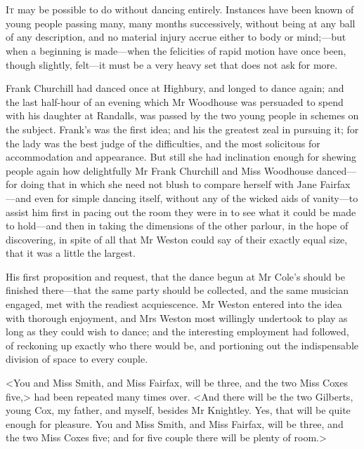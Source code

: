 \chapter[Chapter \thechapter]{}
\lettrine[lraise=0.3]{I}{t} may be possible to do without dancing entirely. Instances have been known of young people passing many, many months successively, without being at any ball of any description, and no material injury accrue either to body or mind;—but when a beginning is made—when the felicities of rapid motion have once been, though slightly, felt—it must be a very heavy set that does not ask for more.

Frank Churchill had danced once at Highbury, and longed to dance again; and the last half-hour of an evening which Mr Woodhouse was persuaded to spend with his daughter at Randalls, was passed by the two young people in schemes on the subject. Frank's was the first idea; and his the greatest zeal in pursuing it; for the lady was the best judge of the difficulties, and the most solicitous for accommodation and appearance. But still she had inclination enough for shewing people again how delightfully Mr Frank Churchill and Miss Woodhouse danced—for doing that in which she need not blush to compare herself with Jane Fairfax—and even for simple dancing itself, without any of the wicked aids of vanity—to assist him first in pacing out the room they were in to see what it could be made to hold—and then in taking the dimensions of the other parlour, in the hope of discovering, in spite of all that Mr Weston could say of their exactly equal size, that it was a little the largest.

His first proposition and request, that the dance begun at Mr Cole's should be finished there—that the same party should be collected, and the same musician engaged, met with the readiest acquiescence. Mr Weston entered into the idea with thorough enjoyment, and Mrs Weston most willingly undertook to play as long as they could wish to dance; and the interesting employment had followed, of reckoning up exactly who there would be, and portioning out the indispensable division of space to every couple.

<You and Miss Smith, and Miss Fairfax, will be three, and the two Miss Coxes five,> had been repeated many times over. <And there will be the two Gilberts, young Cox, my father, and myself, besides Mr Knightley. Yes, that will be quite enough for pleasure. You and Miss Smith, and Miss Fairfax, will be three, and the two Miss Coxes five; and for five couple there will be plenty of room.>

